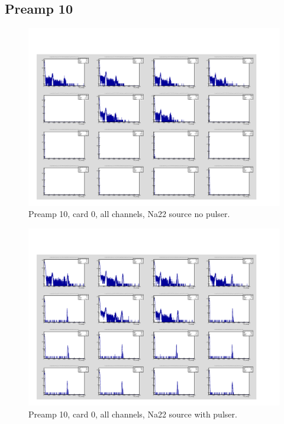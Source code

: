 \documentclass{report}
\begin{document}
\subsection{Preamp 10}
\begin{figure}[!htb]
  \includegraphics[width=\linewidth]{small_box_card0_all_nopulser.png}
  \caption{Preamp 10, card 0, all channels, Na22 source  no pulser.}
\end{figure}
\begin{figure}[!htb]
  \includegraphics[width=\linewidth]{small_box_card0_all.png}
  \caption{Preamp 10, card 0, all channels, Na22 source with pulser.}
\end{figure}
\end{document}
